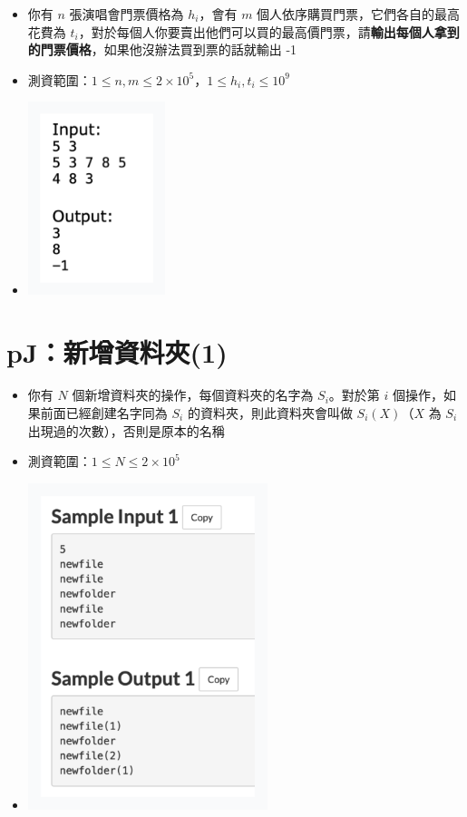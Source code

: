 \documentclass[12pt]{article}
\begin{document}
\begin{itemize}[label={}, itemsep=0pt]
    \item 你有 $n$ 張演唱會門票價格為 $h_i$，會有 $m$ 個人依序購買門票，它們各自的最高花費為 $t_i$，對於每個人你要賣出他們可以買的最高價門票，請\textbf{輸出每個人拿到的門票價格}，如果他沒辦法買到票的話就輸出 -1
    \item 測資範圍：$1 \leq n, m \leq 2 \times 10^5$，$1 \leq h_i, t_i \leq 10^9$
    \item \begin{center}\includegraphics[width=4.0cm]{img/pI}\end{center}
\end{itemize}

\section*{pJ：新增資料夾(1)}
\begin{itemize}[label={}, itemsep=0pt]
    \item 你有 $N$ 個新增資料夾的操作，每個資料夾的名字為 $S_i$。對於第 $i$ 個操作，如果前面已經創建名字同為 $S_i$ 的資料夾，則此資料夾會叫做 $S_i(X)$（$X$ 為 $S_i$ 出現過的次數），否則是原本的名稱
    \item 測資範圍：$1 \leq N \leq 2 \times 10^5$
    \item \begin{center}\includegraphics[width=7.0cm]{img/pJ}\end{center}
\end{itemize}
\end{document}
